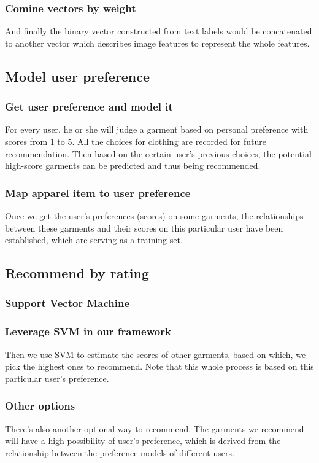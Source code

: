 \subsubsection{Comine vectors by weight}
And finally the binary vector constructed from text labels would be concatenated to another vector which describes image features to represent the whole features.

\subsection{Model user preference}


\subsubsection{Get user preference and model it}
For every user, he or she will judge a garment based on personal 
  preference with scores from 1 to 5. 
All the choices for clothing are recorded for future recommendation. 
Then based on the certain user's previous choices, the potential 
  high-score garments can be predicted and thus being recommended.
  
\subsubsection{Map apparel item to user preference}
Once we get the user's preferences (scores) on some garments, 
  the relationships between these garments and their scores on this
  particular user have been established, which are serving as a training set.

\subsection{Recommend by rating}


\subsubsection{Support Vector Machine}

\subsubsection{Leverage SVM in our framework}
Then we use SVM to estimate the scores of other garments, based on which, 
  we pick the highest ones to recommend. 
Note that this whole process is based on this particular user's preference.

\subsubsection{Other options}
There's also another optional way to recommend. 
The garments we recommend will have a high possibility of user's preference, 
  which is derived from the relationship between the preference models of different users.

